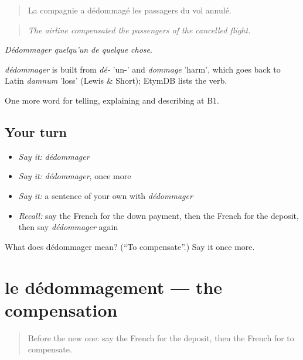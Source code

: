 \begin{quote}
La compagnie a dédommagé les passagers du vol annulé.
\end{quote}

\begin{quote}
\emph{The airline compensated the passengers of the cancelled flight.}
\end{quote}

\emph{Dédommager quelqu'un de quelque chose}.

\begin{cousinweb}
\emph{dédommager} is built from \emph{dé-} 'un-' and \emph{dommage} 'harm', which goes back to Latin \emph{damnum} 'loss' (Lewis \& Short); EtymDB lists the verb.
\end{cousinweb}

\begin{grammarlens}[title={What you've built}]
One more word for telling, explaining and describing at B1.
\end{grammarlens}

\subsection*{Your turn}
\begin{itemize}
\raggedright
  \item \emph{Say it:} \emph{dédommager}
  \item \emph{Say it:} \emph{dédommager}, once more
  \item \emph{Say it:} a sentence of your own with \emph{dédommager}
  \item \emph{Recall:} say the French for the down payment, then the French for the deposit, then say \emph{dédommager} again
\end{itemize}

\begin{tcolorbox}[breakable,colback=teal!4,colframe=teal!35!black,title={Before you move on}]
What does dédommager mean? (\textquotedblleft{}To compensate\textquotedblright{}.) Say it once more.
\end{tcolorbox}
\section[le dédommagement]{le dédommagement — the compensation}

\label{lesson:FR-C433-dedommagement}



\begin{quote}
Before the new one: say the French for the deposit, then the French for to compensate.
\end{quote}

